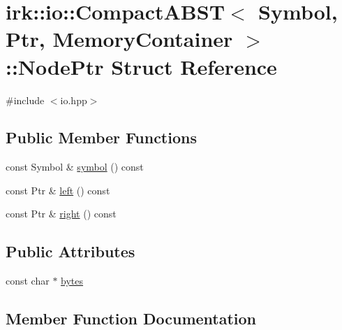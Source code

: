 \hypertarget{structirk_1_1io_1_1CompactABST_1_1NodePtr}{}\section{irk\+:\+:io\+:\+:Compact\+A\+B\+ST$<$ Symbol, Ptr, Memory\+Container $>$\+:\+:Node\+Ptr Struct Reference}
\label{structirk_1_1io_1_1CompactABST_1_1NodePtr}


{\ttfamily \#include $<$io.\+hpp$>$}

\subsection*{Public Member Functions}
\begin{DoxyCompactItemize}
\item 
const Symbol \& \mbox{\hyperlink{structirk_1_1io_1_1CompactABST_1_1NodePtr_aeb8ba22ab1df782e1ac6c6bfa4d332cb}{symbol}} () const
\item 
const Ptr \& \mbox{\hyperlink{structirk_1_1io_1_1CompactABST_1_1NodePtr_ac57d38109a8ca137521649a4626e89dc}{left}} () const
\item 
const Ptr \& \mbox{\hyperlink{structirk_1_1io_1_1CompactABST_1_1NodePtr_aa0f5ed4f9b4c6b462ad5d39b701aed6c}{right}} () const
\end{DoxyCompactItemize}
\subsection*{Public Attributes}
\begin{DoxyCompactItemize}
\item 
const char $\ast$ \mbox{\hyperlink{structirk_1_1io_1_1CompactABST_1_1NodePtr_aae75be8f19fffc0ac63ab70d27d2d862}{bytes}}
\end{DoxyCompactItemize}


\subsection{Member Function Documentation}
\mbox{\label{structirk_1_1io_1_1CompactABST_1_1NodePtr_ac57d38109a8ca137521649a4626e89dc}} 
